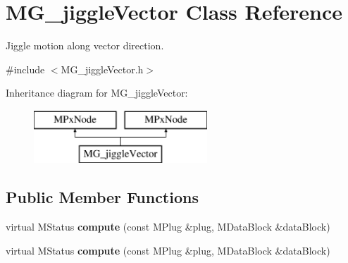 \hypertarget{class_m_g__jiggle_vector}{\section{M\-G\-\_\-jiggle\-Vector Class Reference}
\label{class_m_g__jiggle_vector}
}


Jiggle motion along vector direction.  




{\ttfamily \#include $<$M\-G\-\_\-jiggle\-Vector.\-h$>$}

Inheritance diagram for M\-G\-\_\-jiggle\-Vector\-:\begin{figure}[H]
\begin{center}
\leavevmode
\includegraphics[height=2.000000cm]{class_m_g__jiggle_vector}
\end{center}
\end{figure}
\subsection*{Public Member Functions}
\begin{DoxyCompactItemize}
\item 
\hypertarget{class_m_g__jiggle_vector_a1e833e6b1d077c920a41e39f51b49333}{virtual M\-Status {\bfseries compute} (const M\-Plug \&plug, M\-Data\-Block \&data\-Block)}\label{class_m_g__jiggle_vector_a1e833e6b1d077c920a41e39f51b49333}

\item 
\hypertarget{class_m_g__jiggle_vector_a1e833e6b1d077c920a41e39f51b49333}{virtual M\-Status {\bfseries compute} (const M\-Plug \&plug, M\-Data\-Block \&data\-Block)}\label{class_m_g__jiggle_vector_a1e833e6b1d077c920a41e39f51b49333}

\end{DoxyCompactItemize}
